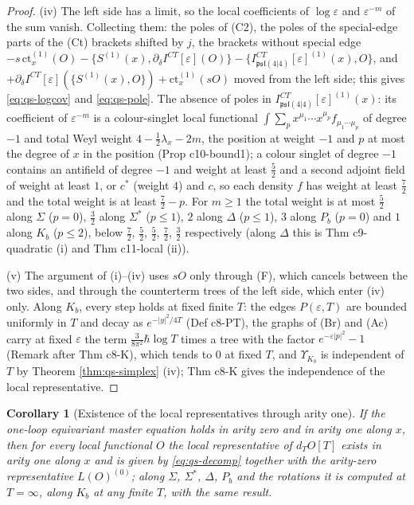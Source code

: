 \documentclass[11pt]{article}
\numberwithin{equation}{section}
\theoremstyle{plain}
\newtheorem{corollary}[theorem]{Corollary}
\theoremstyle{definition}
\begin{document}
\begin{proof}
(iv) The left side has a limit, so the local coefficients of $\log\varepsilon$ and $\varepsilon^{-m}$ of the sum vanish. Collecting them: the poles of (C2), the poles of the special-edge parts of the (Ct) brackets shifted by $j$, the brackets without special edge $-s\,\mathrm{ct}^{(1)}_x(O)-\{S^{(1)}(x),\partial_\delta I^{CT}[\varepsilon](O)\}-\{I^{CT}_{\mathfrak{psl}(4|4)}[\varepsilon]^{(1)}(x),O\}$, and $+\partial_\delta I^{CT}[\varepsilon](\{S^{(1)}(x),O\})+\mathrm{ct}^{(1)}_x(sO)$ moved from the left side; this gives \eqref{eq:qs-logcov} and \eqref{eq:qs-pole}. The absence of poles in $I^{CT}_{\mathfrak{psl}(4|4)}[\varepsilon]^{(1)}(x)$: its coefficient of $\varepsilon^{-m}$ is a colour-singlet local functional $\int\sum_px^{\mu_1}\cdots x^{\mu_p}f_{\mu_1\cdots\mu_p}$ of degree $-1$ and total Weyl weight $4-\tfrac12\lambda_x-2m$, the position at weight $-1$ and $p$ at most the degree of $x$ in the position (Prop c10-bound1); a colour singlet of degree $-1$ contains an antifield of degree $-1$ and weight at least $\tfrac52$ and a second adjoint field of weight at least $1$, or $c^*$ (weight $4$) and $c$, so each density $f$ has weight at least $\tfrac72$ and the total weight is at least $\tfrac72-p$. For $m\ge1$ the total weight is at most $\tfrac52$ along $\Sigma$ ($p=0$), $\tfrac32$ along $\Sigma^*$ ($p\le1$), $2$ along $\Delta$ ($p\le1$), $3$ along $P_b$ ($p=0$) and $1$ along $K_b$ ($p\le2$), below $\tfrac72$, $\tfrac52$, $\tfrac52$, $\tfrac72$, $\tfrac32$ respectively (along $\Delta$ this is Thm c9-quadratic (i) and Thm c11-local (ii)).

(v) The argument of (i)--(iv) uses $sO$ only through (F), which cancels between the two sides, and through the counterterm trees of the left side, which enter (iv) only. Along $K_b$, every step holds at fixed finite $T$: the edges $P(\varepsilon,T)$ are bounded uniformly in $T$ and decay as $e^{-|y|^2/4T}$ (Def c8-PT), the graphs of (Br) and (Ac) carry at fixed $\varepsilon$ the term $\tfrac3{8\pi^2}\hbar\log T$ times a tree with the factor $e^{-\varepsilon|p|^2}-1$ (Remark after Thm c8-K), which tends to $0$ at fixed $T$, and $\Upsilon_{K_b}$ is independent of $T$ by Theorem \ref{thm:qs-simplex} (iv); Thm c8-K gives the independence of the local representative.
\end{proof}

\begin{corollary}[Existence of the local representatives through arity one]
\label{cor:qs-exist}
If the one-loop equivariant master equation holds in arity zero and in arity one along $x$, then for every local functional $O$ the local representative of $d_TO[T]$ exists in arity one along $x$ and is given by \eqref{eq:qs-decomp} together with the arity-zero representative $L(O)^{(0)}$; along $\Sigma$, $\Sigma^*$, $\Delta$, $P_b$ and the rotations it is computed at $T=\infty$, along $K_b$ at any finite $T$, with the same result.
\end{corollary}
\end{document}
